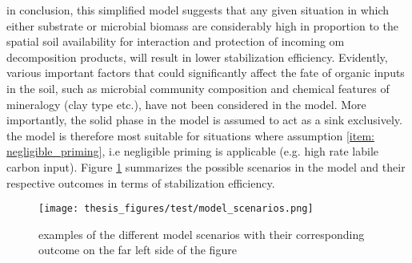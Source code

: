 \documentclass[12pt]{report}
\begin{document}
		in conclusion, this simplified model suggests that any given situation in which either substrate or microbial biomass are considerably high in proportion to the spatial soil availability for interaction and protection of incoming \gls{om} decomposition products, will result in lower stabilization efficiency. Evidently, various important factors that could significantly affect the fate of organic inputs in the soil, such as microbial community composition and  chemical features of mineralogy (clay type etc.), have not been considered in the model. More importantly, the solid phase in the model is assumed to act as a sink exclusively. the model is therefore most suitable for situations where assumption \ref{item: negligible_priming}, i.e negligible priming is applicable (e.g. high rate labile carbon input). Figure \ref{fig:stabilization_model_scenarios} summarizes the possible scenarios in the model and their respective outcomes in terms of stabilization efficiency.\\
		
		\begin{figure}[H]
			\centering
			\texttt{[image: thesis\_figures/test/model\_scenarios.png]}
			\caption{examples of the different model scenarios with their corresponding outcome on the far left side of the figure}
			\label{fig:stabilization_model_scenarios}
		\end{figure}
		
\end{document}

